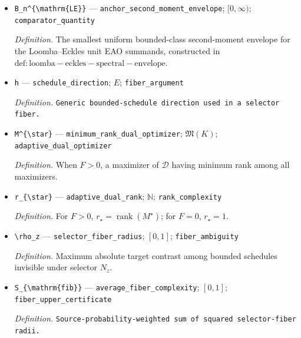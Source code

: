 \documentclass{article}
\begin{document}
\begin{itemize}
  \item \texttt{B\_\allowbreak{}n\textasciicircum{}\{\textbackslash{}\allowbreak{}mathrm\{LE\}\allowbreak{}\}\allowbreak{}} --- \texttt{anchor\_\allowbreak{}second\_\allowbreak{}moment\_\allowbreak{}envelope}; \([0,\infty)\); \texttt{comparator\_\allowbreak{}quantity}
  \par\smallskip\noindent\emph{Definition.} The smallest uniform bounded-class second-moment envelope for the Loomba--Eckles unit EAO summands, constructed in \(\mathrm{def:loomba-eckles-spectral-envelope}\).
  \item \texttt{h} --- \texttt{schedule\_\allowbreak{}direction}; \(E\); \texttt{fiber\_\allowbreak{}argument}
  \par\smallskip\noindent\emph{Definition.} \texttt{Generic bounded-\allowbreak{}schedule direction used in a selector fiber.}
  \item \texttt{M\textasciicircum{}\{\textbackslash{}\allowbreak{}star\}\allowbreak{}} --- \texttt{minimum\_\allowbreak{}rank\_\allowbreak{}dual\_\allowbreak{}optimizer}; \(\mathfrak M(K)\); \texttt{adaptive\_\allowbreak{}dual\_\allowbreak{}optimizer}
  \par\smallskip\noindent\emph{Definition.} When \(F>0\), a maximizer of \(\mathcal D\) having minimum rank among all maximizers.
  \item \texttt{r\_\allowbreak{}\{\textbackslash{}\allowbreak{}star\}\allowbreak{}} --- \texttt{adaptive\_\allowbreak{}dual\_\allowbreak{}rank}; \(\mathbb N\); \texttt{rank\_\allowbreak{}complexity}
  \par\smallskip\noindent\emph{Definition.} For \(F>0\), \(r_{\star}=\operatorname{rank}(M^{\star})\); for \(F=0\), \(r_{\star}=1\).
  \item \texttt{\textbackslash{}\allowbreak{}rho\_\allowbreak{}z} --- \texttt{selector\_\allowbreak{}fiber\_\allowbreak{}radius}; \([0,1]\); \texttt{fiber\_\allowbreak{}ambiguity}
  \par\smallskip\noindent\emph{Definition.} Maximum absolute target contrast among bounded schedules invisible under selector \(N_z\).
  \item \texttt{S\_\allowbreak{}\{\textbackslash{}\allowbreak{}mathrm\{fib\}\allowbreak{}\}\allowbreak{}} --- \texttt{average\_\allowbreak{}fiber\_\allowbreak{}complexity}; \([0,1]\); \texttt{fiber\_\allowbreak{}upper\_\allowbreak{}certificate}
  \par\smallskip\noindent\emph{Definition.} \texttt{Source-\allowbreak{}probability-\allowbreak{}weighted sum of squared selector-\allowbreak{}fiber radii.}

\end{itemize}
\end{document}
